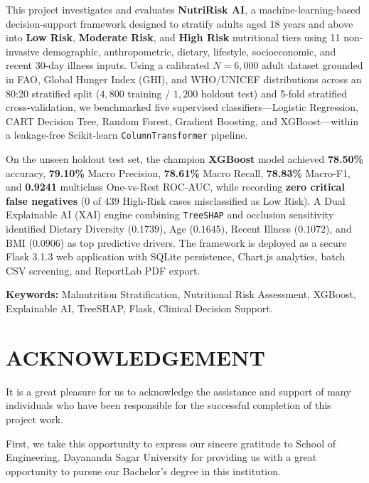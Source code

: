 \documentclass[12pt,a4paper]{report}
\begin{document}
This project investigates and evaluates \textbf{NutriRisk AI}, a machine-learning-based decision-support framework designed to stratify adults aged 18 years and above into \textbf{Low Risk}, \textbf{Moderate Risk}, and \textbf{High Risk} nutritional tiers using 11 non-invasive demographic, anthropometric, dietary, lifestyle, socioeconomic, and recent 30-day illness inputs. Using a calibrated $N = 6{,}000$ adult dataset grounded in FAO, Global Hunger Index (GHI), and WHO/UNICEF distributions across an 80:20 stratified split ($4{,}800$ training / $1{,}200$ holdout test) and 5-fold stratified cross-validation, we benchmarked five supervised classifiers---Logistic Regression, CART Decision Tree, Random Forest, Gradient Boosting, and XGBoost---within a leakage-free Scikit-learn \texttt{ColumnTransformer} pipeline.

On the unseen holdout test set, the champion \textbf{XGBoost} model achieved \textbf{78.50\%} accuracy, \textbf{79.10\%} Macro Precision, \textbf{78.61\%} Macro Recall, \textbf{78.83\%} Macro-F1, and \textbf{0.9241} multiclass One-vs-Rest ROC-AUC, while recording \textbf{zero critical false negatives} ($0$ of $439$ High-Risk cases misclassified as Low Risk). A Dual Explainable AI (XAI) engine combining \texttt{TreeSHAP} and occlusion sensitivity identified Dietary Diversity ($0.1739$), Age ($0.1645$), Recent Illness ($0.1072$), and BMI ($0.0906$) as top predictive drivers. The framework is deployed as a secure Flask 3.1.3 web application with SQLite persistence, Chart.js analytics, batch CSV screening, and ReportLab PDF export.

\vspace{10pt}
\noindent\textbf{Keywords:} Malnutrition Stratification, Nutritional Risk Assessment, XGBoost, Explainable AI, TreeSHAP, Flask, Clinical Decision Support.
\newpage

\chapter*{ACKNOWLEDGEMENT}
\thispagestyle{plain}

It is a great pleasure for us to acknowledge the assistance and support of many individuals who have been responsible for the successful completion of this project work.

First, we take this opportunity to express our sincere gratitude to School of Engineering, Dayananda Sagar University for providing us with a great opportunity to pursue our Bachelor's degree in this institution.
\end{document}
